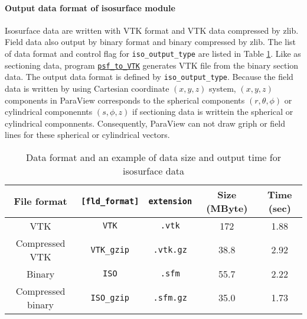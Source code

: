 \paragraph{Output data format of isosurface module}
\label{sec:PSF_data}
Isosurface data are written with VTK format and VTK data compressed by zlib. Field data also output by binary format and binary compressed by zlib. The list of data format and control flag for \verb|iso_output_type| are listed in Table \ref{table:ISO_data}. Like as sectioning data, program \hyperref[section:psf_to_VTK]{\tt psf\_to\_VTK} generates VTK file from the binary section data. The output data format is defined by \verb|iso_output_type|. Because the field data is written by using Cartesian coordinate $(x,y,z)$ system, $(x,y,z)$ components in ParaView corresponds to the spherical components $(r, \theta, \phi)$ or cylindrical componennts $(s,\phi, z)$ if sectioning data is writtein the spherical or cylindrical componnents. Consequently, ParaView can not draw griph or field lines for these spherical or cylindrical vectors.
%
\begin{table}[htp]
\caption{Data format and an example of data size and output time for isosurface data}
\label{table:ISO_data}
\begin{center} 
\begin{tabular}{|c|c|c|c|c|}
\hline
File format & \verb|[fld_format]| & \verb|extension| &  Size  (MByte) & Time (sec)   \\ \hline \hline
VTK &\verb|VTK| &  \verb|.vtk| & 172 & 1.88 \\ \hline
Compressed VTK &\verb|VTK_gzip| &  \verb|.vtk.gz| & 38.8 & 2.92  \\ \hline
Binary &\verb|ISO| &  \verb|.sfm| & 55.7 & 2.22 \\ \hline
Compressed binary & \verb|ISO_gzip| & \verb|.sfm.gz| & 35.0 &  1.73  \\ \hline
\end{tabular}
\end{center} 
\end{table} 
%

